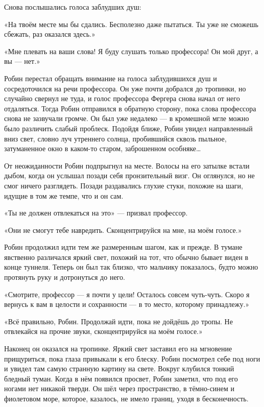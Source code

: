 \documentclass[a4paper,12pt]{book}
\begin{document}
\par
Снова послышались голоса заблудших душ:
\par
«На твоём месте мы бы сдались. Бесполезно даже пытаться. Ты уже не сможешь сбежать, раз оказался здесь.»
\par
«Мне плевать на ваши слова! Я буду слушать только профессора! Он мой друг, а вы — нет.»\\
\par
Робин перестал обращать внимание на голоса заблудившихся душ и сосредоточился на речи профессора. Он уже почти добрался до тропинки, но случайно свернул не туда, и голос профессора Фергера снова начал от него отдаляться. Тогда Робин отправился в обратную сторону, пока слова профессора снова не зазвучали громче. Он был уже недалеко — в кромешной мгле можно было различить слабый проблеск. Подойдя ближе, Робин увидел направленный вниз свет, словно луч утреннего солнца, пробившийся сквозь пыльное, затуманенное окно в каком-то старом, заброшенном особняке…
\par
От неожиданности Робин подпрыгнул на месте. Волосы на его затылке встали дыбом, когда он услышал позади себя пронзительный визг. Он оглянулся, но не смог ничего разглядеть. Позади раздавались глухие стуки, похожие на шаги, идущие в том же темпе, что и он сам.
\par
«Ты не должен отвлекаться на это» — призвал профессор.
\par
«Они не смогут тебе навредить. Сконцентрируйся на мне, на моём голосе.»
\par
Робин продолжил идти тем же размеренным шагом, как и прежде. В тумане явственно различался яркий свет, похожий на тот, что обычно бывает виден в конце туннеля. Теперь он был так близко, что мальчику показалось, будто можно протянуть руку и дотронуться до него.
\par
«Смотрите, профессор — я почти у цели! Осталось совсем чуть-чуть. Скоро я вернусь к вам в целости и сохранности — в то место, которому принадлежу.»
\par
«Всё правильно, Робин. Продолжай идти, пока не дойдёшь до тропы. Не отвлекайся на прочие звуки, сконцентрируйся на моём голосе.»\\
\par
Наконец он оказался на тропинке. Яркий свет заставил его на мгновение прищуриться, пока глаза привыкали к его блеску. Робин посмотрел себе под ноги и увидел там самую странную картину на свете. Вокруг клубился тонкий бледный туман. Когда в нём появился просвет, Робин заметил, что под его ногами нет никакой тверди. Он шёл через пространство, в тёмно-синем и фиолетовом море, которое, казалось, не имело границ, уходя в бесконечность.
\end{document}
